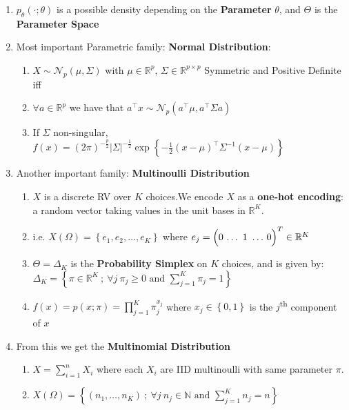 \documentclass[a4paper,portrait,columns=2, hidelinks]{cheatsheet}
\begin{document}
\begin{enumerate}
	\item  $p_\theta (\cdot ; \theta)$ is a possible density depending on the \textbf{Parameter} $ \theta $, and $\Theta $ is the \textbf{Parameter Space}
	\item Most important Parametric family: \textbf{Normal Distribution}:
	\begin{enumerate}
		\item \(X \sim \mathcal{N}_p(\mu, \Sigma)\) with \(\mu\in\mathbb{R}^p\), \(\Sigma \in \mathbb{R}^{p \times p}\) Symmetric and Positive Definite iff
		\item  \(\forall a \in \mathbb{R}^p\) we have that \(a^\intercal x \sim \mathcal{N}_p(a^\intercal\mu, a^\intercal\Sigma a)\)
		\item If \(\Sigma\) non-singular, \(f(x)={(2\pi)}^{-\frac{p}{2}}|\Sigma|^{-\frac{1}{2}}\exp{ \left\{-\frac{1}{2}(x-\mu)^\intercal\Sigma^{-1}(x-\mu) \right\} } \)
	\end{enumerate}
	\item Another important family: \textbf{Multinoulli Distribution}
	\begin{enumerate}
		\item $X$ is a discrete RV over $K$ choices.We encode $X$ as a \textbf{one-hot encoding}: a random vector taking values in the unit bases in $\mathbb{R}^{K}$.
		
		\item i.e. \(X(\Omega) = \left\{e_{1}, e_{2}, \ldots, e_{K}\right\}\) where \(e_{j} = \left(0\,\ldots\tikz[remember picture,baseline]{\node[anchor=base] (one-hot-1) {$1$};}\ldots\,0\right)^{T} \in \mathbb{R}^{K}\)
		
		\hfill
		
		\item  $\Theta = \Delta_{K}$ is the \textbf{Probability Simplex} on $K$ choices, and is given by: \(\Delta_{K} = \left\{\pi \in \mathbb{R}^{K}\ ;\ \forall j\ \pi_{j} \geq 0 \text{ and } \sum_{j=1}^{K}\pi_{j} = 1\right\}\)
		\item \(f(x) = p(x;\pi) = \prod_{j=1}^{K}\pi_{j}^{x_{j}}\) where \(x_{j} \in \left\{0,1\right\}\) is the $j$\textsuperscript{th} component of $x$
	\end{enumerate}
	\item From this we get the \textbf{Multinomial Distribution}
	\begin{enumerate}
		\item \(X = \sum_{i=1}^{n}X_{i}\) where each \(X_i\) are IID multinoulli with same parameter \(\pi\).
		\item \(X(\Omega) = \left\{(n_{1},\ldots,n_{K})\ ;\ \forall j\ n_{j} \in \mathbb{N} \text{ and } \sum_{j=1}^{K}n_{j} = n\right\}\)
	\end{enumerate}
\end{enumerate}
\end{document}
